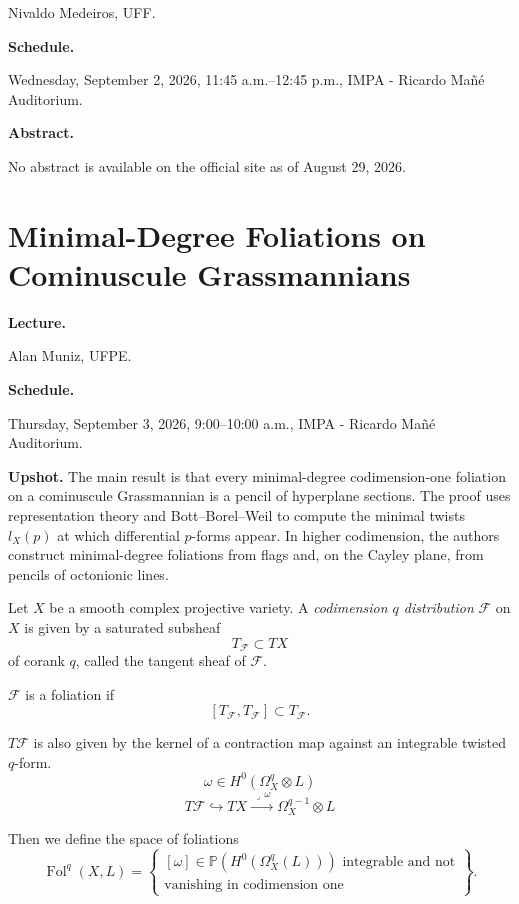 Nivaldo Medeiros,
UFF.

\medskip\noindent
{\bf Schedule.}

Wednesday, September 2, 2026,
11:45 a.m.--12:45 p.m.,
IMPA - Ricardo Ma\~n\'e Auditorium.

\medskip\noindent
{\bf Abstract.}

No abstract is available on the official
site as of August 29, 2026.

\section{Minimal-Degree Foliations on
Cominuscule Grassmannians}
\label{section-minimal-degree-foliations}

\medskip\noindent
{\bf Lecture.}

Alan Muniz,
UFPE.

\medskip\noindent
{\bf Schedule.}

Thursday, September 3, 2026,
9:00--10:00 a.m.,
IMPA - Ricardo Ma\~n\'e Auditorium.

\medskip\noindent
{\bf Upshot.}
The main result is that every
minimal-degree codimension-one foliation
on a cominuscule Grassmannian is a pencil
of hyperplane sections.
The proof uses representation theory and
Bott--Borel--Weil to compute the minimal
twists $l_X(p)$ at which differential
$p$-forms appear.
In higher codimension, the authors
construct minimal-degree foliations from
flags and, on the Cayley plane, from
pencils of octonionic lines.


\medskip\noindent
\begin{definition}
\label{definition-distribution}
Let $X$ be a smooth complex projective
variety.
A {\it codimension $q$ distribution}
$\mathcal{F}$ on $X$ is given by a
saturated subsheaf
$$
T_{\mathcal{F}}\subset TX
$$
of corank $q$, called the tangent sheaf of
$\mathcal{F}$.

$\mathcal{F}$ is a foliation if
$$
[T_{\mathcal{F}},T_{\mathcal{F}}]
\subset T_{\mathcal{F}}.
$$

$T\mathcal{F}$ is also given by the kernel
of a contraction map against an
integrable twisted $q$-form.
$$
\omega\in H^0(\Omega_X^q\otimes L)
$$
$$
T\mathcal{F}\hookrightarrow TX
\xrightarrow{\;\lrcorner\,\omega\;}
\Omega_X^{q-1}\otimes L
$$
\end{definition}

\begin{definition}
\label{definition-space-of-foliations}
Then we define the space of foliations
$$
\operatorname{Fol}^q(X,L)
=
\left\{
\begin{array}{c}
[\omega]\in
\mathbb{P}(H^0(\Omega_X^q(L)))
\text{ integrable and not}\\
\text{vanishing in codimension one}
\end{array}
\right\}.
$$
\end{definition}

